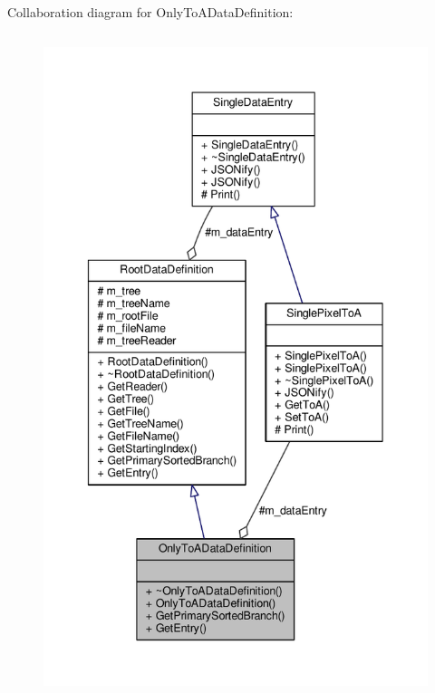 Collaboration diagram for Only\+To\+A\+Data\+Definition\+:
\nopagebreak
\begin{figure}[H]
\begin{center}
\leavevmode
\includegraphics[height=550pt]{classOnlyToADataDefinition__coll__graph}
\end{center}
\end{figure}
